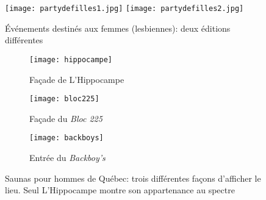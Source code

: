 \begin{figure}[ht]
 \centering
 {\texttt{[image: partydefilles1.jpg]}}
 {\texttt{[image: partydefilles2.jpg]}}
 \caption[Événements destinés aux femmes (lesbiennes)]{Événements destinés aux femmes (lesbiennes): deux éditions différentes}\label{figs:partydefilles}
\end{figure}

\begin{figure}[ht]
 \centering
 \begin{subfigure}[b]{.45\linewidth}
 \texttt{[image: hippocampe]}
 \caption{Façade de L'Hippocampe\label{fig:hippocampe}}
 \end{subfigure}

 \begin{subfigure}[b]{.45\linewidth}
 \texttt{[image: bloc225]}
 \caption{Façade du \emph{Bloc 225}\label{fig:bloc225}}
 \end{subfigure}
 \begin{subfigure}[b]{.45\linewidth}
 \texttt{[image: backboys]}
 \caption{Entrée du \emph{Backboy's}\label{fig:backboys}}
 \end{subfigure}
 \caption[Saunas pour hommes de Québec]{Saunas pour hommes de Québec: trois différentes façons d'afficher le lieu. Seul L'Hippocampe montre son appartenance au spectre \lgbt{}}\label{figs:saunas}
\end{figure}

